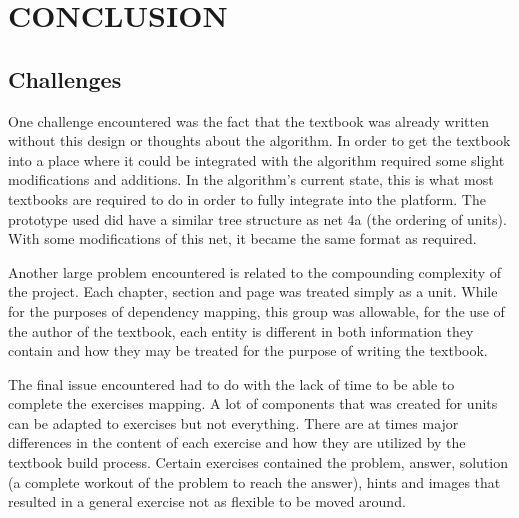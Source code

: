 %
%
%
%

\chapter{CONCLUSION}

\section{Challenges}

One challenge encountered was the fact that the textbook was already written without this design or thoughts about the algorithm. In order to get the textbook into a place where it could be integrated with the algorithm required some slight modifications and additions. In the algorithm's current state, this is what most textbooks are required to do in order to fully integrate into the platform. The prototype used did have a similar tree structure as net 4a (the ordering of units). With some modifications of this net, it became the same format as required.

Another large problem encountered is related to the compounding complexity of the project. Each chapter, section and page was treated simply as a unit. While for the purposes of dependency mapping, this group was allowable, for the use of the author of the textbook, each entity is different in both information they contain and how they may be treated for the purpose of writing the textbook.

The final issue encountered had to do with the lack of time to be able to complete the exercises mapping. A lot of components that was created for units can be adapted to exercises but not everything. There are at times major differences in the content of each exercise and how they are utilized by the textbook build process. Certain exercises contained the problem, answer, solution (a complete workout of the problem to reach the answer), hints and images that resulted in a general exercise not as flexible to be moved around.

